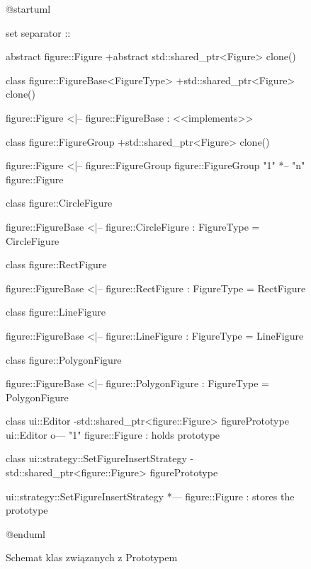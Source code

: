\documentclass[a4paper,12pt]{article}
\begin{document}
\begin{figure}[H]

\begin{plantuml}
@startuml

set separator ::

abstract figure::Figure {
  +{abstract} std::shared_ptr<Figure> clone()
}

class figure::FigureBase<FigureType> {
  +std::shared_ptr<Figure> clone()
}

figure::Figure <|-- figure::FigureBase : <<implements>>

class figure::FigureGroup {
  +std::shared_ptr<Figure> clone()
}

figure::Figure <|-- figure::FigureGroup
figure::FigureGroup "1" *-- "n" figure::Figure

class figure::CircleFigure {
}

figure::FigureBase <|-- figure::CircleFigure : FigureType = CircleFigure

class figure::RectFigure {
}

figure::FigureBase <|-- figure::RectFigure : FigureType = RectFigure

class figure::LineFigure {
}

figure::FigureBase <|-- figure::LineFigure : FigureType = LineFigure

class figure::PolygonFigure {
}

figure::FigureBase <|-- figure::PolygonFigure : FigureType = PolygonFigure
 
class ui::Editor {
  -std::shared_ptr<figure::Figure> figurePrototype
}
ui::Editor o--- "1" figure::Figure : holds prototype

class ui::strategy::SetFigureInsertStrategy {
  -std::shared_ptr<figure::Figure> figurePrototype
}

ui::strategy::SetFigureInsertStrategy *--- figure::Figure : stores the prototype

@enduml
\end{plantuml}

\caption{Schemat klas związanych z Prototypem}

\end{figure}
\end{document}

